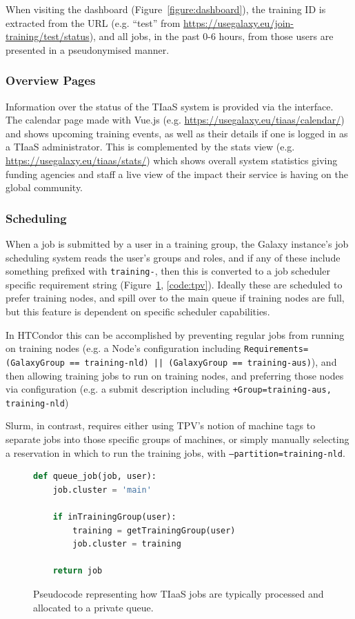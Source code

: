 When visiting the dashboard (Figure~\ref{figure:dashboard}), the training ID is extracted from the URL (e.g. ``test'' from \url{https://usegalaxy.eu/join-training/test/status}), and all jobs, in the past 0-6 hours, from those users are presented in a pseudonymised manner.

\subsubsection*{Overview Pages}
Information over the status of the TIaaS system is provided via the interface. The calendar page made with Vue.js \cite{Vue} (e.g. \url{https://usegalaxy.eu/tiaas/calendar/}) and shows upcoming training events, as well as their details if one is logged in as a TIaaS administrator. This is complemented by the stats view (e.g. \url{https://usegalaxy.eu/tiaas/stats/}) which shows overall system statistics giving funding agencies and staff a live view of the impact their service is having on the global community.

\subsubsection*{Scheduling}
When a job is submitted by a user in a training group, the Galaxy instance's job scheduling system reads the user's groups and roles, and if any of these include something prefixed with \texttt{training-}, then this is converted to a job scheduler specific requirement string (Figure~\ref{code:scheduler}, \ref{code:tpv}). Ideally these are scheduled to prefer training nodes, and spill over to the main queue if training nodes are full, but this feature is dependent on specific scheduler capabilities.

In HTCondor this can be accomplished by preventing regular jobs from running on training nodes (e.g. a Node's configuration including \texttt{Requirements=(GalaxyGroup == training-nld) || (GalaxyGroup == training-aus)}), and then allowing training jobs to run on training nodes, and preferring those nodes via configuration (e.g. a submit description including \texttt{+Group=\textquotedbl{}training-aus, training-nld\textquotedbl})

Slurm, in contrast, requires either using TPV's notion of machine tags to separate jobs into those specific groups of machines, or simply manually selecting a reservation in which to run the training jobs, with \texttt{--partition=training-nld}.

\begin{figure}[!ht]
\centering
\begin{lstlisting}[language=Python]
def queue_job(job, user):
    job.cluster = 'main'

    if inTrainingGroup(user):
        training = getTrainingGroup(user)
        job.cluster = training

    return job
\end{lstlisting}
\caption{Pseudocode representing how TIaaS jobs are typically processed and allocated to a private queue.\label{code:scheduler}}
\end{figure}

